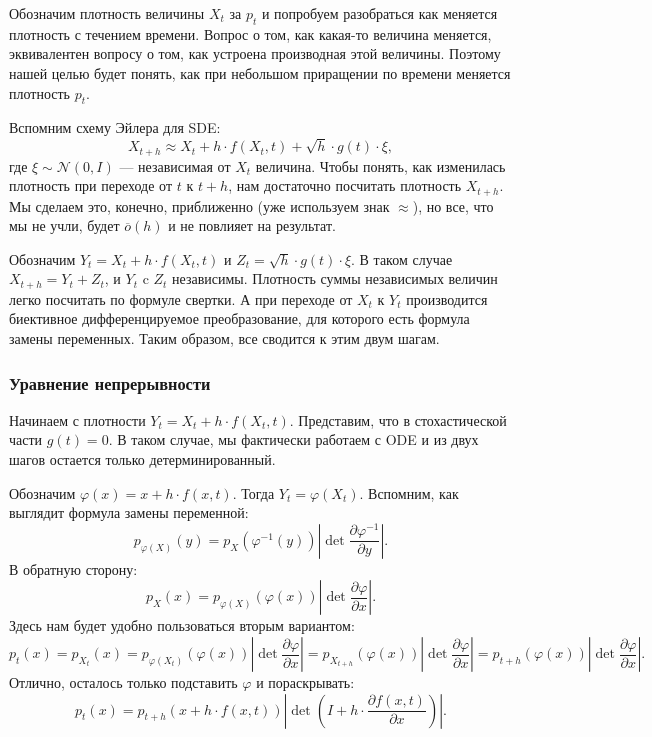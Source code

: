 \documentclass[12pt]{article}
\theoremstyle{definition}
\begin{document}
Обозначим плотность величины $X_t$ за $p_t$ и попробуем разобраться как меняется плотность с течением времени. Вопрос о том, как какая-то величина меняется, эквивалентен вопросу о том, как устроена производная этой величины. Поэтому нашей целью будет понять, как при небольшом приращении по времени меняется плотность $p_t$.

Вспомним схему Эйлера для SDE:
\[
    X_{t + h} \approx X_t + h \cdot f(X_t, t) + \sqrt{h} \cdot g(t) \cdot \xi,
\]
где $\xi \sim \mathcal{N}(0, I)$ --- независимая от $X_t$ величина. Чтобы понять, как изменилась плотность при переходе от $t$ к $t + h$, нам достаточно посчитать плотность $X_{t + h}$. Мы сделаем это, конечно, приближенно (уже используем знак $\approx$), но все, что мы не учли, будет $\overline{o}(h)$ и не повлияет на результат.

Обозначим $Y_t = X_t + h \cdot f(X_t, t)$ и $Z_t = \sqrt{h} \cdot g(t) \cdot \xi$. В таком случае $X_{t + h} = Y_t + Z_t$, и $Y_t$ c $Z_t$ независимы. Плотность суммы независимых величин легко посчитать по формуле свертки. А при переходе от $X_t$ к $Y_t$ производится биективное дифференцируемое преобразование, для которого есть формула замены переменных. Таким образом, все сводится к этим двум шагам.

\subsubsection{Уравнение непрерывности}
Начинаем с плотности $Y_t = X_t + h \cdot f(X_t, t)$. Представим, что в стохастической части $g(t) = 0$. В таком случае, мы фактически работаем с ODE и из двух шагов остается только детерминированный.

Обозначим $\varphi(x) = x + h \cdot f(x, t)$. Тогда $Y_t = \varphi(X_t)$. Вспомним, как выглядит формула замены переменной:
\[
    p_{\varphi(X)}\left(y\right) = p_X\left(\varphi^{-1}(y)\right)\left| \det \frac{\partial \varphi^{-1}}{\partial y} \right|.
\]
В обратную сторону:
\[
    p_X\left(x\right) = p_{\varphi(X)}\left(\varphi(x)\right) \left|\det \frac{\partial \varphi}{\partial x} \right|.
\]
Здесь нам будет удобно пользоваться вторым вариантом:
\[
    p_{t}(x) = p_{X_t}(x) = p_{\varphi(X_t)}(\varphi(x)) \left| \det \frac{\partial \varphi}{\partial x} \right| = p_{X_{t + h}}(\varphi(x)) \left| \det \frac{\partial \varphi}{\partial x} \right| = p_{t + h}(\varphi(x)) \left| \det \frac{\partial \varphi}{\partial x} \right|.
\]
Отлично, осталось только подставить $\varphi$ и пораскрывать:
\[
    p_t(x) = p_{t + h}\left(x + h \cdot f(x, t)\right) \left| \det \left(I + h \cdot \frac{\partial f(x, t)}{\partial x} \right)\right|.
\]
\end{document}
